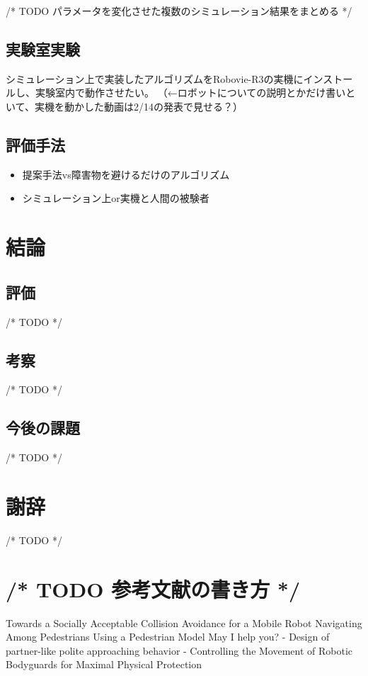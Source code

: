 \documentclass[12pt,titlepage]{jsarticle}
\begin{document}
/* TODO パラメータを変化させた複数のシミュレーション結果をまとめる */


\subsection{実験室実験}
シミュレーション上で実装したアルゴリズムをRobovie-R3の実機にインストールし、実験室内で動作させたい。
（←ロボットについての説明とかだけ書いといて、実機を動かした動画は2/14の発表で見せる？）


\subsection{評価手法}

\begin{itemize}
\item 提案手法vs障害物を避けるだけのアルゴリズム
\item シミュレーション上or実機と人間の被験者
\end{itemize}


\section{結論}


\subsection{評価}
/* TODO */

\subsection{考察}
/* TODO */

\subsection{今後の課題}
/* TODO */

\section{謝辞}
/* TODO */

\section*{/* TODO \downarrow 参考文献の書き方 */}

\begin{thebibliography}{3}
 Towards a Socially Acceptable Collision Avoidance for a Mobile Robot Navigating Among Pedestrians Using a Pedestrian Model
 May I help you? - Design of partner-like polite approaching behavior -
 Controlling the Movement of Robotic Bodyguards for Maximal Physical Protection
\end{thebibliography}
\end{document}
